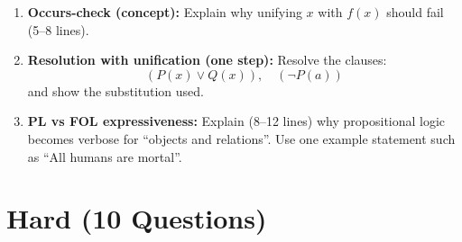 \documentclass[11pt,a4paper]{article}
\begin{document}
\begin{enumerate}[label=M\arabic*., leftmargin=*]
  \item \textbf{Occurs-check (concept):} Explain why unifying $x$ with $f(x)$ should fail (5--8 lines).

  \item \textbf{Resolution with unification (one step):} Resolve the clauses:
    \[
      (P(x) \lor Q(x)),\quad (\lnot P(a))
    \]
    and show the substitution used.

  \item \textbf{PL vs FOL expressiveness:} Explain (8--12 lines) why propositional logic becomes verbose for ``objects and relations''.
    Use one example statement such as ``All humans are mortal''.
\end{enumerate}

\section*{Hard (10 Questions)}
\end{document}
